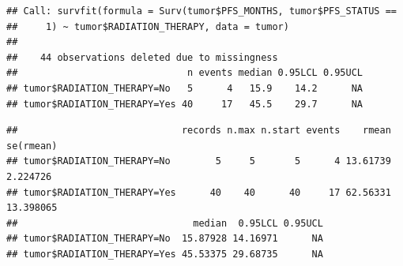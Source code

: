\documentclass[
  11pt,
]{article}
\newenvironment{Shaded}{\begin{snugshade}}{\end{snugshade}}
\newcommand{\AttributeTok}[1]{\textcolor[rgb]{0.77,0.63,0.00}{#1}}
\newcommand{\DecValTok}[1]{\textcolor[rgb]{0.00,0.00,0.81}{#1}}
\newcommand{\FunctionTok}[1]{\textcolor[rgb]{0.00,0.00,0.00}{#1}}
\newcommand{\NormalTok}[1]{#1}
\newcommand{\OtherTok}[1]{\textcolor[rgb]{0.56,0.35,0.01}{#1}}
\newcommand{\SpecialCharTok}[1]{\textcolor[rgb]{0.00,0.00,0.00}{#1}}
\newcommand{\StringTok}[1]{\textcolor[rgb]{0.31,0.60,0.02}{#1}}
\begin{document}
\begin{Shaded}
\end{Shaded}

\begin{verbatim}
## Call: survfit(formula = Surv(tumor$PFS_MONTHS, tumor$PFS_STATUS == 
##     1) ~ tumor$RADIATION_THERAPY, data = tumor)
## 
##    44 observations deleted due to missingness 
##                              n events median 0.95LCL 0.95UCL
## tumor$RADIATION_THERAPY=No   5      4   15.9    14.2      NA
## tumor$RADIATION_THERAPY=Yes 40     17   45.5    29.7      NA
\end{verbatim}

\begin{Shaded}
\end{Shaded}

\begin{verbatim}
##                             records n.max n.start events    rmean se(rmean)
## tumor$RADIATION_THERAPY=No        5     5       5      4 13.61739  2.224726
## tumor$RADIATION_THERAPY=Yes      40    40      40     17 62.56331 13.398065
##                               median  0.95LCL 0.95UCL
## tumor$RADIATION_THERAPY=No  15.87928 14.16971      NA
## tumor$RADIATION_THERAPY=Yes 45.53375 29.68735      NA
\end{verbatim}

\newpage
\end{document}
